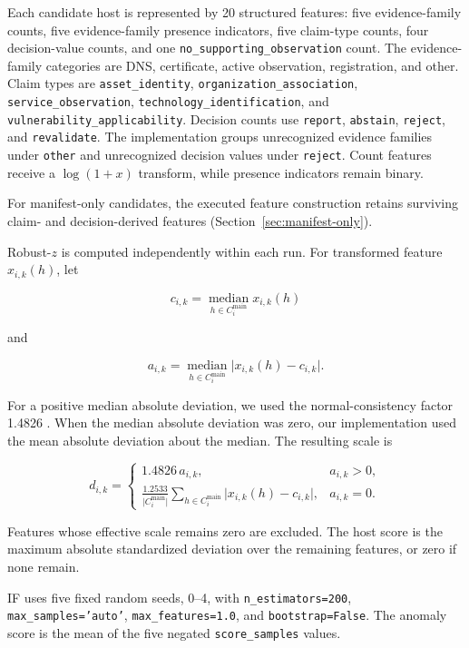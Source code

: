 \documentclass[sn-basic]{sn-jnl}%
\theoremstyle{thmstyleone}%
\theoremstyle{thmstyletwo}%
\theoremstyle{thmstylethree}%
\begin{document}
Each candidate host is represented by 20 structured features: five evidence-family counts, five evidence-family presence indicators, five claim-type counts, four decision-value counts, and one \texttt{no\_supporting\_observation} count. The evidence-family categories are DNS, certificate, active observation, registration, and other. Claim types are \texttt{asset\_identity}, \texttt{organization\_association}, \texttt{service\_observation}, \texttt{technology\_identification}, and \texttt{vulnerability\_applicability}. Decision counts use \texttt{report}, \texttt{abstain}, \texttt{reject}, and \texttt{revalidate}. The implementation groups unrecognized evidence families under \texttt{other} and unrecognized decision values under \texttt{reject}. Count features receive a \(\log(1+x)\) transform, while presence indicators remain binary.

For manifest-only candidates, the executed feature construction retains surviving claim- and decision-derived features (Section~\ref{sec:manifest-only}).

Robust-\(z\) is computed independently within each run. For transformed feature \(x_{i,k}(h)\), let

\[
c_{i,k}=\operatorname*{median}_{h\in C_i^{\mathrm{main}}} x_{i,k}(h)
\]

and

\[
a_{i,k}=\operatorname*{median}_{h\in C_i^{\mathrm{main}}}\lvert x_{i,k}(h)-c_{i,k}\rvert.
\]

For a positive median absolute deviation, we used the normal-consistency factor 1.4826 \citep{rousseeuw1993}. When the median absolute deviation was zero, our implementation used the mean absolute deviation about the median. The resulting scale is

\[
d_{i,k}=\begin{cases}1.4826\,a_{i,k}, & a_{i,k}>0, \\ \displaystyle\frac{1.2533}{\lvert C_i^{\mathrm{main}}\rvert}\sum_{h\in C_i^{\mathrm{main}}}\lvert x_{i,k}(h)-c_{i,k}\rvert, & a_{i,k}=0.\end{cases}
\]

Features whose effective scale remains zero are excluded. The host score is the maximum absolute standardized deviation over the remaining features, or zero if none remain.

IF uses five fixed random seeds, 0--4, with \texttt{n\_estimators=200}, \texttt{max\_samples='auto'}, \texttt{max\_features=1.0}, and \texttt{bootstrap=False}. The anomaly score is the mean of the five negated \texttt{score\_samples} values.
\end{document}
